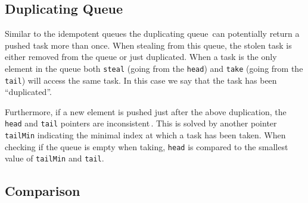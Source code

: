 \subsection{Duplicating Queue}
Similar to the idempotent queues the duplicating queue\,\cite[p. 233]{Leijen:2009:DTP:1639949.1640106} can potentially return a pushed task more than once. When stealing from this queue, the stolen task is either removed from the queue or just duplicated. When a task is the only element in the queue both \texttt{steal} (going from the \texttt{head}) and \texttt{take} (going from the \texttt{tail}) will access the same task. In this case we say that the task has been ``duplicated''.

Furthermore, if a new element is pushed just after the above duplication, the \texttt{head} and \texttt{tail} pointers are inconsistent\,\cite[p. 235]{Leijen:2009:DTP:1639949.1640106}. This is solved by another pointer \texttt{tailMin} indicating the minimal index at which a task has been taken. When checking if the queue is empty when taking, \texttt{head} is compared to the smallest value of \texttt{tailMin} and \texttt{tail}.

\subsection{Comparison}
